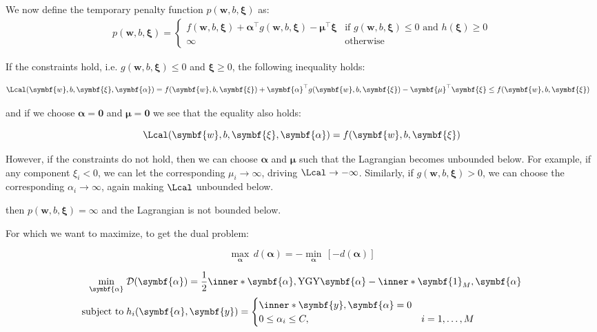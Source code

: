 We now define the temporary penalty function \(p(\symbf{w}, b, \symbf{\xi})\) as:
\begin{align*}
  p(\symbf{w}, b, \symbf{\xi}) =
  \begin{cases}
    f(\symbf{w}, b, \symbf{\xi}) + \symbf{\alpha}^\top g(\symbf{w}, b, \symbf{\xi}) - \symbf{\mu}^\top \symbf{\xi} & \text{if } g(\symbf{w}, b,  \symbf{\xi}) \leq 0 \text{ and } h(\symbf{\xi}) \geq 0 \\
    \infty                                                                                                         & \text{otherwise}
  \end{cases}
\end{align*}

If the constraints hold, i.e. \(g(\symbf{w}, b, \symbf{\xi}) \leq 0\) and \(\symbf{\xi} \geq 0\), the following inequality holds:

\begin{align*}
  \Lcal(\symbf{w}, b, \symbf{\xi}, \symbf{\alpha}) & = f(\symbf{w}, b, \symbf{\xi}) + \symbf{\alpha}^\top g(\symbf{w}, b, \symbf{\xi}) - \symbf{\mu}^\top \symbf{\xi} \leq f(\symbf{w}, b, \symbf{\xi})
\end{align*}

and if we choose \(\symbf{\alpha} = \symbf{0}\) and \(\symbf{\mu} = \symbf{0}\) we see that the equality also holds:

\begin{equation*}
  \Lcal(\symbf{w}, b, \symbf{\xi}, \symbf{\alpha}) = f(\symbf{w}, b, \symbf{\xi})
\end{equation*}

However, if the constraints do not hold, then we can choose \(\symbf{\alpha}\) and \(\symbf{\mu}\) such that the Lagrangian becomes unbounded below. For example, if any component \(\xi_i < 0\), we can let the corresponding \(\mu_i \to \infty\), driving \(\Lcal \to -\infty\). Similarly, if \(g(\symbf{w}, b, \symbf{\xi}) > 0\), we can choose the corresponding \(\alpha_i \to \infty\), again making \(\Lcal\) unbounded below.


then \(p(\symbf{w}, b, \symbf{\xi}) = \infty\) and the Lagrangian is not bounded below.


For which we want to maximize, to get the dual problem:

\begin{equation*}
  \max_{\symbf{\alpha}}\, d(\symbf{\alpha})  = -\min_{\symbf{\alpha}} \,\left[-d(\symbf{\alpha})\right]
\end{equation*}

\begin{align*}
  \min_{\symbf{\alpha}} \; & \mathcal{D}(\symbf{\alpha}) = \frac{1}{2} \inner*{\symbf{\alpha}, \mathrm{Y} \mathrm{G} \mathrm{Y} \symbf{\alpha}} - \inner*{\symbf{1}_M, \symbf{\alpha}} \\
  \text{subject to} \;     & h_i(\symbf{\alpha}, \symbf{y}) =
  \begin{cases}
    \inner*{\symbf{y}, \symbf{\alpha}} = 0     \\
    0 \leq \alpha_i \leq C, & i = 1, \ldots, M
  \end{cases}
\end{align*}

